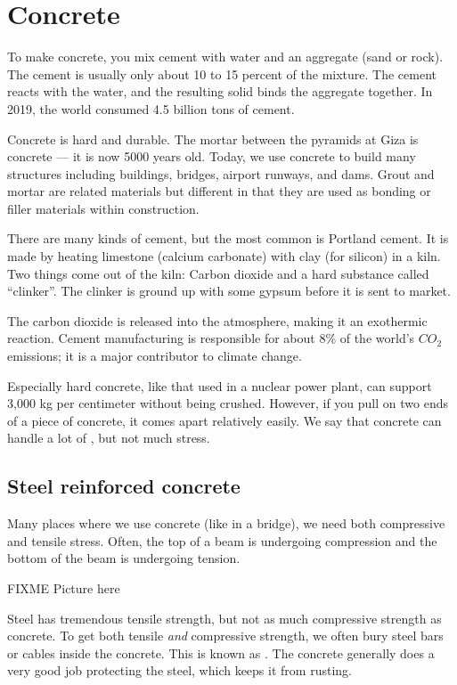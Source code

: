 \chapter{Concrete}

To make concrete, you mix cement with water and an aggregate (sand or
rock).  The cement is usually only about 10 to 15 percent of the
mixture. The cement reacts with the water, and the resulting solid
binds the aggregate together. In 2019, the world consumed 4.5 billion
tons of cement. 

Concrete is hard and durable. The mortar between the pyramids at Giza
is concrete --- it is now 5000 years old. Today, we use concrete to
build many structures including buildings, bridges, airport runways,
and dams. Grout and mortar are related materials but different in that 
they are used as bonding or filler materials within construction.


There are many kinds of cement, but the most common is Portland
cement. It is made by heating limestone (calcium carbonate) with clay
(for silicon) in a kiln. Two things come out of the kiln: Carbon
dioxide and a hard substance called ``clinker''.  The clinker is
ground up with some gypsum before it is sent to market. 

The carbon dioxide is released into the atmosphere, making it an exothermic reaction. Cement manufacturing
is responsible for about 8\% of the world's $CO_2$ emissions; it is a
major contributor to climate change.

Especially hard concrete, like that used in a nuclear power plant, can
support 3,000 kg per centimeter without being crushed. However, if
you pull on two ends of a piece of concrete, it comes apart relatively
easily. We say that concrete can handle a lot of , but not much  stress.

\section{Steel reinforced concrete}

Many places where we use concrete (like in a bridge), we need both
compressive and tensile stress. Often, the top of a beam is undergoing
compression and the bottom of the beam is undergoing tension.

FIXME Picture here

Steel has tremendous tensile strength, but not as much compressive
strength as concrete. To get both tensile \emph{and} compressive
strength, we often bury steel bars or cables inside the concrete.
This is known as . The concrete
generally does a very good job protecting the steel, which keeps it
from rusting.

